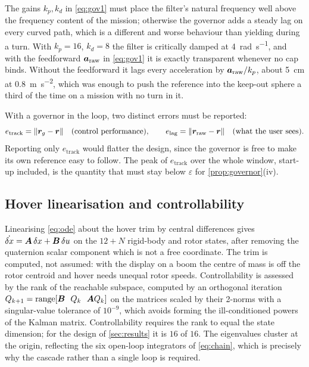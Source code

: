 \begin{remark}
The gains $k_p,k_d$ in \cref{eq:gov1} must place the filter's natural frequency
well above the frequency content of the mission; otherwise the governor adds a
steady lag on every curved path, which is a different and worse behaviour than
yielding during a turn. With $k_p=16$, $k_d=8$ the filter is critically damped
at \SI{4}{\radian\per\second}, and with the feedforward $\bm{a}_{\mathrm{raw}}$
in \cref{eq:gov1} it is exactly transparent whenever no cap binds. Without the
feedforward it lags every acceleration by $\bm{a}_{\mathrm{raw}}/k_p$, about
\SI{5}{\centi\metre} at \SI{0.8}{\metre\per\second\squared}, which was enough
to push the reference into the keep-out sphere a third of the time on a mission
with no turn in it.
\end{remark}

\begin{definition}
With a governor in the loop, two distinct errors must be reported:
\begin{equation}
  e_{\mathrm{track}} = \|\bm{r}_g - \bm{r}\|
  \quad\text{(control performance)},
  \qquad
  e_{\mathrm{lag}} = \|\bm{r}_{\mathrm{raw}} - \bm{r}\|
  \quad\text{(what the user sees)} .
  \label{eq:twoerrors}
\end{equation}
Reporting only $e_{\mathrm{track}}$ would flatter the design, since the governor
is free to make its own reference easy to follow. The peak of
$e_{\mathrm{track}}$ over the whole window, start-up included, is the quantity
that must stay below $\varepsilon$ for \cref{prop:governor}(iv).
\end{definition}

\subsection{Hover linearisation and controllability}

Linearising \cref{eq:ode} about the hover trim by central differences gives
$\dot{\delta x} = \bm{A}\,\delta x + \bm{B}\,\delta u$ on the $12+N$ rigid-body
and rotor states, after removing the quaternion scalar component which is not
a free coordinate. The trim is computed, not assumed: with the display on a
boom the centre of mass is off the rotor centroid and hover needs unequal
rotor speeds. Controllability is assessed by the rank of the reachable
subspace, computed by an orthogonal iteration
$Q_{k+1} = \operatorname{range}[\bm{B}\ \ Q_k\ \ \bm{A} Q_k]$ on the matrices
scaled by their 2-norms with a singular-value tolerance of $10^{-9}$, which
avoids forming the ill-conditioned powers of the Kalman matrix. Controllability
requires the rank to equal the state dimension; for the design of
\cref{sec:results} it is $16$ of $16$. The eigenvalues cluster at the origin,
reflecting the six open-loop integrators of \cref{eq:chain}, which is
precisely why the cascade rather than a single loop is required.
